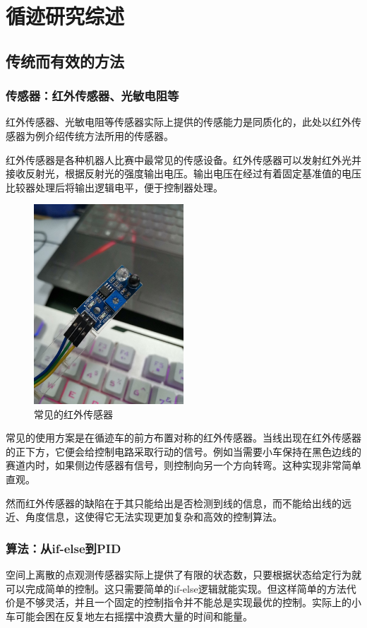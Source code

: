 \documentclass{report}
\begin{document}
\newpage
\section{循迹研究综述}
\subsection{传统而有效的方法\cite{intro2023robot}}
\label{subsec:label}
\subsubsection{传感器：红外传感器、光敏电阻等}
\label{subsec:label}
红外传感器、光敏电阻等传感器实际上提供的传感能力是同质化的，此处以红外传感器为例介绍传统方法所用的传感器。

红外传感器是各种机器人比赛中最常见的传感设备。红外传感器可以发射红外光并接收反射光，根据反射光的强度输出电压。输出电压在经过有着固定基准值的电压比较器处理后将输出逻辑电平，便于控制器处理。
\begin{figure}[ht]
  \centering
  \includegraphics[width=0.5\textwidth]{figures/sensor.jpg}
  \caption{ 常见的红外传感器}
\end{figure}

常见的使用方案是在循迹车的前方布置对称的红外传感器。当线出现在红外传感器的正下方，它便会给控制电路采取行动的信号。例如当需要小车保持在黑色边线的赛道内时，如果侧边传感器有信号，则控制向另一个方向转弯。这种实现非常简单直观。

然而红外传感器的缺陷在于其只能给出是否检测到线的信息，而不能给出线的远近、角度信息，这使得它无法实现更加复杂和高效的控制算法。
\newpage
\subsubsection{算法：从if-else到PID}
\label{subsec:label}
空间上离散的点观测传感器实际上提供了有限的状态数，只要根据状态给定行为就可以完成简单的控制。这只需要简单的if-else逻辑就能实现。但这样简单的方法代价是不够灵活，并且一个固定的控制指令并不能总是实现最优的控制。实际上的小车可能会困在反复地左右摇摆中浪费大量的时间和能量。
\end{document}
